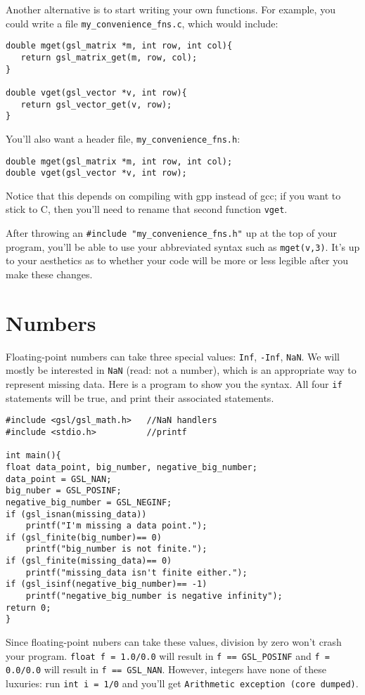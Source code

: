 Another alternative is to start writing your own functions. For example, you
could write a file {\tt my\_convenience\_fns.c}, which would include:

\begin{verbatim}
double mget(gsl_matrix *m, int row, int col){
   return gsl_matrix_get(m, row, col);
}

double vget(gsl_vector *v, int row){
   return gsl_vector_get(v, row);
}
\end{verbatim}

You'll also want a header file, {\tt my\_convenience\_fns.h}:
\begin{verbatim}
double mget(gsl_matrix *m, int row, int col);
double vget(gsl_vector *v, int row);
\end{verbatim}

Notice that this depends on compiling with gpp instead of gcc; if you want to
stick to C, then you'll need to rename that second function {\tt vget}.

After throwing an {\tt \#include "my\_convenience\_fns.h"} up at the top of your
program, you'll be able to use your abbreviated syntax such as {\tt mget(v,3)}.
It's up to your aesthetics as to whether your code will be more or less
legible after you make these changes. 


\section{Numbers}   
Floating-point numbers can take three special values: {\tt Inf}, {\tt -Inf}, {\tt NaN}. We will mostly be
interested in {\tt NaN} (read: not a number), which is an appropriate way to represent missing data. Here is a
program to show you the syntax. All four {\tt if} statements will be true, and print their associated
statements.
\begin{verbatim}
#include <gsl/gsl_math.h>   //NaN handlers
#include <stdio.h>          //printf

int main(){
float data_point, big_number, negative_big_number;
data_point = GSL_NAN;
big_nuber = GSL_POSINF;
negative_big_number = GSL_NEGINF;
if (gsl_isnan(missing_data))
    printf("I'm missing a data point.");
if (gsl_finite(big_number)== 0)
    printf("big_number is not finite.");
if (gsl_finite(missing_data)== 0)
    printf("missing_data isn't finite either.");
if (gsl_isinf(negative_big_number)== -1)
    printf("negative_big_number is negative infinity");
return 0;
}
\end{verbatim}
Since floating-point nubers can take these values, division by zero
won't crash your program. {\tt float f = 1.0/0.0} will result in
{\tt f == GSL\_POSINF} and {\tt f = 0.0/0.0} will result in {\tt f ==
GSL\_NAN}. However, integers have none of these luxuries: run {\tt int
i = 1/0} and you'll get {\tt Arithmetic exception (core dumped)}.


